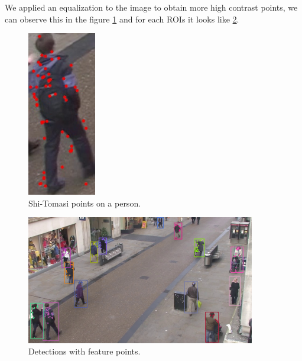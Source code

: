We applied an equalization to the image to obtain more high contrast points, we can observe this in the figure \ref{solution2} and for each ROIs it looks like \ref{solution3}.


\begin{figure}[H]
\centering         
\includegraphics[width=3cm]{implementation/pointsEQU.jpg}
\caption{Shi-Tomasi points on a person.} \label{solution2}
\end{figure}



\begin{figure}[H]
\centering         
\includegraphics[width=10cm]{intro/pounts.jpg}
\caption{Detections with feature points.} \label{solution3}
\end{figure}

 




